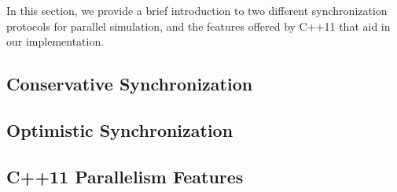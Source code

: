 In this section, we provide a brief introduction to two different synchronization protocols for parallel simulation, and the features offered by C++11 that aid in our implementation.

\subsection{Conservative Synchronization}
\subsection{Optimistic Synchronization}
\subsection{C++11 Parallelism Features}
